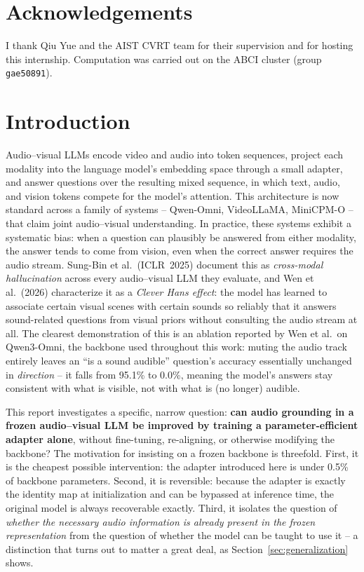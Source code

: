 \documentclass[11pt,a4paper,oneside]{article}
\begin{document}
\section*{Acknowledgements}
\noindent
I thank Qiu Yue and the AIST CVRT team for their supervision and for hosting this internship.
Computation was carried out on the ABCI cluster (group \texttt{gae50891}).

\tableofcontents
\clearpage

\section{Introduction}
\label{sec:intro}

Audio--visual LLMs encode video and audio into token sequences, project each modality into the
language model's embedding space through a small adapter, and answer questions over the resulting
mixed sequence, in which text, audio, and vision tokens compete for the model's attention. This
architecture is now standard across a family of systems -- Qwen-Omni, VideoLLaMA, MiniCPM-O -- that
claim joint audio--visual understanding. In practice, these systems exhibit a systematic bias: when
a question can plausibly be answered from either modality, the answer tends to come from vision, even
when the correct answer requires the audio stream. Sung-Bin et al.\ (ICLR~2025) document this as
\emph{cross-modal hallucination} across every audio--visual LLM they evaluate, and Wen et al.\ (2026)
characterize it as a \emph{Clever Hans effect}: the model has learned to associate certain visual
scenes with certain sounds so reliably that it answers sound-related questions from visual priors
without consulting the audio stream at all. The clearest demonstration of this is an ablation
reported by Wen et al.\ on Qwen3-Omni, the backbone used throughout this work: muting the audio track
entirely leaves an ``is a sound audible'' question's accuracy essentially unchanged in \emph{direction}
-- it falls from 95.1\% to 0.0\%, meaning the model's answers stay consistent with what is visible,
not with what is (no longer) audible.

This report investigates a specific, narrow question: \textbf{can audio grounding in a frozen
audio--visual LLM be improved by training a parameter-efficient adapter alone}, without fine-tuning,
re-aligning, or otherwise modifying the backbone? The motivation for insisting on a frozen backbone
is threefold. First, it is the cheapest possible intervention: the adapter introduced here is
under 0.5\% of backbone parameters. Second, it is reversible: because the adapter is exactly the
identity map at initialization and can be bypassed at inference time, the original model is always
recoverable exactly. Third, it isolates the question of \emph{whether the necessary audio information
is already present in the frozen representation} from the question of whether the model can be taught
to use it -- a distinction that turns out to matter a great deal, as Section~\ref{sec:generalization}
shows.
\end{document}
